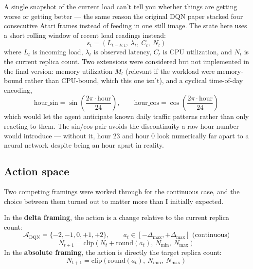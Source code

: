 \documentclass{rapportINPTCLOUD}
\begin{document}
A single snapshot of the current load can't tell you whether things are getting worse or getting better — the same reason the original DQN paper \cite{mnih2015} stacked four consecutive Atari frames instead of feeding in one still image. The state here uses a short rolling window of recent load readings instead:
\begin{equation}
s_t = (L_{t-k:t},\ \lambda_t,\ C_t,\ N_t)
\end{equation}
where $L_t$ is incoming load, $\lambda_t$ is observed latency, $C_t$ is CPU utilization, and $N_t$ is the current replica count. Two extensions were considered but not implemented in the final version: memory utilization $M_t$ (relevant if the workload were memory-bound rather than CPU-bound, which this one isn't), and a cyclical time-of-day encoding,
\begin{equation}
\text{hour\_sin} = \sin\!\left(\frac{2\pi \cdot \text{hour}}{24}\right), \qquad
\text{hour\_cos} = \cos\!\left(\frac{2\pi \cdot \text{hour}}{24}\right)
\end{equation}
which would let the agent anticipate known daily traffic patterns rather than only reacting to them. The sin/cos pair avoids the discontinuity a raw hour number would introduce — without it, hour 23 and hour 0 look numerically far apart to a neural network despite being an hour apart in reality.

\subsection{Action space}
\label{sec:action-space}

Two competing framings were worked through for the continuous case, and the choice between them turned out to matter more than I initially expected.

In the \textbf{delta framing}, the action is a change relative to the current replica count:
\begin{equation}
\mathcal{A}_{\text{DQN}} = \{-2,-1,0,+1,+2\}, \qquad a_t \in [-\Delta_{\max}, +\Delta_{\max}] \text{ (continuous)}
\end{equation}
\begin{equation}
N_{t+1} = \text{clip}(N_t + \text{round}(a_t),\ N_{\min},\ N_{\max})
\end{equation}
In the \textbf{absolute framing}, the action is directly the target replica count:
\begin{equation}
N_{t+1} = \text{clip}(\text{round}(a_t),\ N_{\min},\ N_{\max})
\end{equation}
\end{document}

